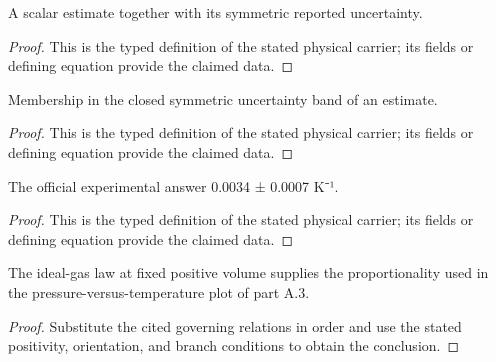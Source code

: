\begin{definition}
  \label{def:physics:IPhO_2026_4_A_5:aux013}
  A scalar estimate together with its symmetric reported uncertainty.
\end{definition}
\begin{proof}
  This is the typed definition of the stated physical carrier; its fields or defining equation provide the claimed data.
\end{proof}

\begin{definition}
  \label{def:physics:IPhO_2026_4_A_5:aux014}
  Membership in the closed symmetric uncertainty band of an estimate.
\end{definition}
\begin{proof}
  This is the typed definition of the stated physical carrier; its fields or defining equation provide the claimed data.
\end{proof}

\begin{definition}
  \label{def:physics:IPhO_2026_4_A_5:aux015}
  The official experimental answer 0.0034 ± 0.0007 K⁻¹.
\end{definition}
\begin{proof}
  This is the typed definition of the stated physical carrier; its fields or defining equation provide the claimed data.
\end{proof}

\begin{lemma}
  \label{lem:physics:IPhO_2026_4_A_5:aux016}
  The ideal-gas law at fixed positive volume supplies the proportionality used in the pressure-versus-temperature plot of part A.3.
\end{lemma}
\begin{proof}
  Substitute the cited governing relations in order and use the stated positivity, orientation, and branch conditions to obtain the conclusion.
\end{proof}

